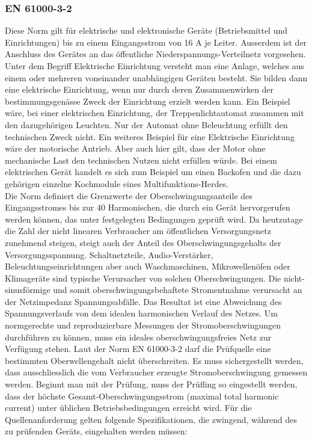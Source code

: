 \subsubsection{EN 61000-3-2}
Diese Norm gilt für elektrische und elektronische Geräte (Betriebsmittel und Einrichtungen) bis zu einem Eingangsstrom von 16 A je Leiter. Ausserdem ist der Anschluss des Gerätes an das öffentliche Niederspannungs-Verteilnetz vorgesehen. Unter dem Begriff Elektrische Einrichtung versteht man eine Anlage, welches aus einem oder mehreren voneinander unabhängigen Geräten besteht. Sie bilden dann eine elektrische Einrichtung, wenn nur durch deren Zusammenwirken der bestimmungsgenässe Zweck der Einrichtung erzielt werden kann. Ein Beispiel wäre, bei einer elektrischen Einrichtung, der Treppenlichtautomat zusammen mit den dazugehörigen Leuchten. Nur der Automat ohne Beleuchtung erfüllt den technischen Zweck nicht. Ein weiteres Beispiel für eine Elektrische Einrichtung wäre der motorische Antrieb. Aber auch hier gilt, dass der Motor ohne mechanische Last den technischen Nutzen nicht erfüllen würde. Bei einem elektrischen Gerät handelt es sich zum Beispiel um einen Backofen und die dazu gehörigen einzelne Kochmodule eines Multifunktions-Herdes.\\
Die Norm definiert die Grenzwerte der Oberschwingungsanteile des Eingangsstromes bis zur 40 Harmonischen, die durch ein Gerät hervorgerufen werden können, das unter festgelegten Bedingungen geprüft wird. Da heutzutage die Zahl der nicht linearen Verbraucher am öffentlichen Versorgungsnetz zunehmend steigen, steigt auch der Anteil des Oberschwingungsgehalts der Versorgungsspannung. Schaltnetzteile, Audio-Verstärker, Beleuchtungseinrichtungen aber auch Waschmaschinen, Mikrowellenöfen oder Klimageräte sind typische Verursacher von solchen Oberschwingungen.
Die nicht-sinusförmige und somit oberschwingungsbehaftete Stromentnahme verursacht an der Netzimpedanz Spannungsabfälle. Das Resultat ist eine Abweichung des Spannungsverlaufs von dem idealen harmonischen Verlauf des Netzes. Um normgerechte und reproduzierbare Messungen der Stromoberschwingungen durchführen zu können, muss ein ideales oberschwingungsfreies Netz zur Verfügung stehen. Laut der Norm EN 61000-3-2 darf die Prüfquelle eine bestimmten Oberwellengehalt nicht überschreiten. Es muss sichergestellt werden, dass ausschliesslich die vom Verbraucher erzeugte Stromoberschwingung gemessen werden. Beginnt man mit der Prüfung, muss der Prüfling so eingestellt werden, dass der höchste Gesamt-Oberschwingungsstrom (maximal total harmonic current) unter üblichen Betriebsbedingungen erreicht wird.
Für die Quellenanforderung gelten folgende Spezifikationen, die zwingend, während des zu prüfenden Geräts, eingehalten werden müssen:

